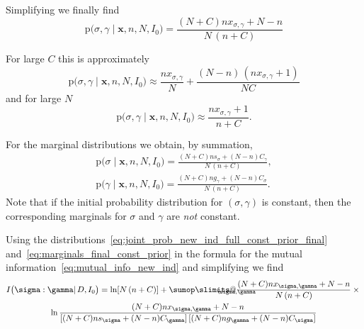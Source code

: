 \documentclass[\ifafour a4paper,12pt,\else a5paper,10pt,\fi%
onecolumn,oneside,article,%
british%
]{memoir}
\makeatletter
\theoremstyle{remark}
\theoremstyle{innote}
\def\sum{\DOTSI\sumop\slimits@}
\newcommand*{\pf}{\mathrm{p}}%
\renewcommand*{\|}{\mathpunct{|}}
\newcommand*{\yD}{D}
\newcommand*{\mI}{I}
\newcommand*{\ys}{\sigma}
\newcommand*{\yg}{\gamma}
\newcommand*{\yso}{\ys}
\newcommand*{\ygo}{\yg}
\newcommand*{\yf}{\bm{x}}
\newcommand*{\yIc}{I_{0}}
\newcommand*{\yCs}{C_{\sigma}}
\newcommand*{\yCg}{C_{\gamma}}
\makeatother
\begin{document}
Simplifying we finally find
\begin{equation}
    \label{eq:joint_prob_new_ind_full_const_prior_final}
  \pf\bigl(\yso, \ygo \| \yf, n,N, \yIc\bigr)  =
\frac{(N+C) n x_{\yso, \ygo}+N-n}{N\,(n+C)}
\end{equation}

For large $C$ this is approximately
\begin{equation}
    \label{eq:joint_prob_new_ind_full_const_prior_final_approx_C}
    \pf\bigl(\yso, \ygo \| \yf, n,N, \yIc\bigr)  \approx
    \frac{n x_{\yso, \ygo}}{N} +
    \frac{(N-n)\,(n x_{\yso, \ygo} +1)}{N C}
\end{equation}
and for large $N$
\begin{equation}
    \label{eq:joint_prob_new_ind_full_const_prior_final_approx_N}
    \pf\bigl(\yso, \ygo \| \yf, n,N, \yIc\bigr)  \approx
    \frac{n x_{\yso, \ygo} +1}{n + C}.
\end{equation}

For the marginal distributions we obtain, by summation,
\begin{gather}
  \label{eq:marginals_final_const_prior}
    \pf\bigl(\yso \| \yf, n,N, \yIc\bigr)  =
\frac{(N+C) n s_{\yso}+(N-n)\yCg}{N\,(n+C)},
\\
    \pf\bigl(\ygo \| \yf, n,N, \yIc\bigr)  =
\frac{(N+C) n g_{\ygo}+(N-n)\yCs}{N\,(n+C)}.
\end{gather}
Note that if the initial probability distribution for $(\yso, \ygo)$
is constant, then the corresponding marginals for $\yso$ and $\ygo$
are \emph{not} constant.

Using the
distributions~\eqref{eq:joint_prob_new_ind_full_const_prior_final}
and~\eqref{eq:marginals_final_const_prior} in the formula for the mutual
information~\eqref{eq:mutual_info_new_ind} and simplifying we find
\begin{multline}
  \label{eq:mutual_info_final}
  \mI\bigl( \yso : \ygo \| \yD,\yIc \bigr) =
  \ln[N\,(n+C)] +
  \sum_{\mathclap{\yso,\ygo}}
  \frac{(N+C) n x_{\yso, \ygo}+N-n}{N\,(n+C)}\times{}\\
  \ln\frac{(N+C) n x_{\yso, \ygo}+N-n}{
    [(N+C) n s_{\yso}+(N-n)\yCg]\,
    [(N+C) n g_{\ygo}+(N-n)\yCs]
  }
\end{multline}
\end{document}
